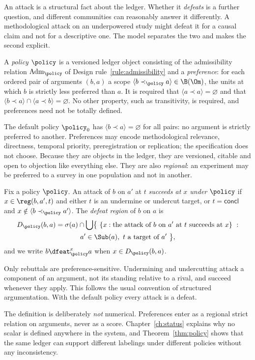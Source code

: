 An attack is a structural fact about the ledger. Whether it \emph{defeats} is a further question, and different communities can reasonably answer it differently. A methodological attack on an underpowered study might defeat it for a causal claim and not for a descriptive one. The model separates the two and makes the second explicit.

\begin{definition}[Policy]\label{def:policy}
A \emph{policy} $\policy$ is a versioned ledger object consisting of the admissibility relation $\mathrm{Adm}_\policy$ of Design rule~\ref{rule:admissibility} and a \emph{preference}: for each ordered pair of arguments $(b,a)$ a scope $\langle b\prec_\policy a\rangle\in\B(\Om)$, the units at which $b$ is strictly less preferred than $a$. It is required that $\langle a\prec a\rangle=\varnothing$ and that $\langle b\prec a\rangle\cap\langle a\prec b\rangle=\varnothing$. No other property, such as transitivity, is required, and preferences need not be totally defined.
\end{definition}

The default policy $\policy_0$ has $\langle b\prec a\rangle=\varnothing$ for all pairs: no argument is strictly preferred to another. Preferences may encode methodological relevance, directness, temporal priority, preregistration or replication; the specification does not choose. Because they are objects in the ledger, they are versioned, citable and open to objection like everything else. They are also \emph{regional}: an experiment may be preferred to a survey in one population and not in another.

\begin{definition}[Defeat]\label{def:defeat}
Fix a policy $\policy$. An attack of $b$ on $a'$ at $t$ \emph{succeeds at $x$ under $\policy$} if $x\in\reg(b,a',t)$ and either $t$ is an undermine or undercut target, or $t=\mathsf{concl}$ and $x\notin\langle b\prec_\policy a'\rangle$. The \emph{defeat region} of $b$ on $a$ is
\begin{multline*}
D_\policy(b,a)=\sigma(a)\cap\bigcup\bigl\{\ \{x:\text{the attack of }b\text{ on }a'\text{ at }t\text{ succeeds at }x\}\ :\\
a'\in\Sub(a),\ t\text{ a target of }a'\ \bigr\},
\end{multline*}
and we write $b\dfeat_\policy^x a$ when $x\in D_\policy(b,a)$.
\end{definition}

Only rebuttals are preference-sensitive. Undermining and undercutting attack a component of an argument, not its standing relative to a rival, and succeed whenever they apply. This follows the usual convention of structured argumentation. With the default policy every attack is a defeat.

The definition is deliberately \emph{not} numerical. Preferences enter as a regional strict relation on arguments, never as a score. Chapter~\ref{ch:status} explains why no scalar is defined anywhere in the system, and Theorem~\ref{thm:policy} shows that the same ledger can support different labelings under different policies without any inconsistency.

